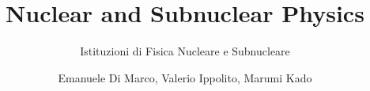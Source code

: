 \documentclass[graybox,envcountchap,sectrefs]{svmono}
\begin{document}
\title{Nuclear and Subnuclear Physics}
\subtitle{Istituzioni di Fisica Nucleare e Subnucleare}

\author{Emanuele Di Marco, Valerio Ippolito, Marumi Kado}

\maketitle

\frontmatter%

%
%



\tableofcontents

%


\mainmatter%

















%

%
%
%



%



%

\backmatter%
%


\end{document}
